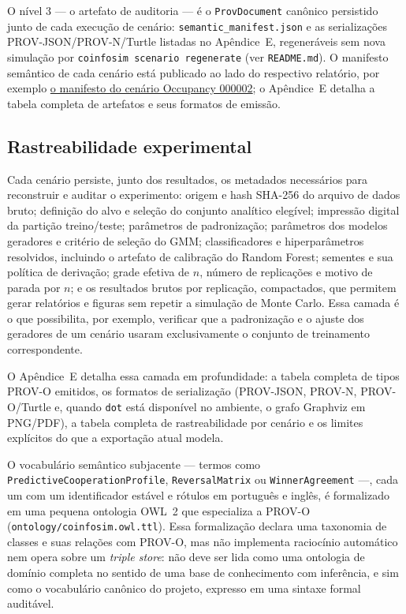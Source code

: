 O nível 3 --- o artefato de auditoria --- é o \texttt{ProvDocument} canônico persistido junto de cada execução de cenário: \texttt{semantic\_manifest.json} e as serializações PROV-JSON/PROV-N/Turtle listadas no Apêndice~E, regeneráveis sem nova simulação por \texttt{coinfosim scenario regenerate} (ver \texttt{README.md}). O manifesto semântico de cada cenário está publicado ao lado do respectivo relatório, por exemplo \href{https://paulorenatoaz.github.io/coinfosim/reports/scenarios/000002_occupancy_baseline_full/semantic_manifest.json}{o manifesto do cenário Occupancy 000002}; o Apêndice~E detalha a tabela completa de artefatos e seus formatos de emissão.

\subsection{Rastreabilidade experimental}

Cada cenário persiste, junto dos resultados, os metadados necessários para reconstruir e auditar o experimento: origem e hash SHA-256 do arquivo de dados bruto; definição do alvo e seleção do conjunto analítico elegível; impressão digital da partição treino/teste; parâmetros de padronização; parâmetros dos modelos geradores e critério de seleção do GMM; classificadores e hiperparâmetros resolvidos, incluindo o artefato de calibração do Random Forest; sementes e sua política de derivação; grade efetiva de $n$, número de replicações e motivo de parada por $n$; e os resultados brutos por replicação, compactados, que permitem gerar relatórios e figuras sem repetir a simulação de Monte Carlo. Essa camada é o que possibilita, por exemplo, verificar que a padronização e o ajuste dos geradores de um cenário usaram exclusivamente o conjunto de treinamento correspondente.

O Apêndice~E detalha essa camada em profundidade: a tabela completa de tipos PROV-O emitidos, os formatos de serialização (PROV-JSON, PROV-N, PROV-O/Turtle e, quando \texttt{dot} está disponível no ambiente, o grafo Graphviz em PNG/PDF), a tabela completa de rastreabilidade por cenário e os limites explícitos do que a exportação atual modela.

\begin{sloppypar}
O vocabulário semântico subjacente --- termos como \texttt{PredictiveCooperationProfile}, \texttt{ReversalMatrix} ou \texttt{WinnerAgreement} ---, cada um com um identificador estável e rótulos em português e inglês, é formalizado em uma pequena ontologia OWL~2 que especializa a PROV-O (\texttt{ontology/coinfosim.owl.ttl}). Essa formalização declara uma taxonomia de classes e suas relações com PROV-O, mas não implementa raciocínio automático nem opera sobre um \emph{triple store}: não deve ser lida como uma ontologia de domínio completa no sentido de uma base de conhecimento com inferência, e sim como o vocabulário canônico do projeto, expresso em uma sintaxe formal auditável.
\end{sloppypar}
